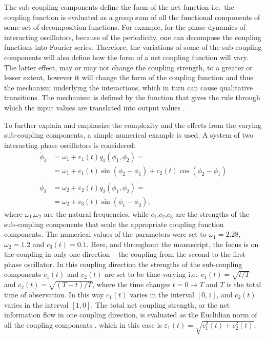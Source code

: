 \documentclass[pre,aps,twocolumn,showpacs]{revtex4}
\begin{document}
The sub-coupling components define the form of the net function i.e.\ the coupling function is evaluated as a group sum of all the functional components of some set of decomposition functions. For example, for the phase dynamics of interacting oscillators, because of the periodicity, one can decompose the coupling functions into Fourier series. Therefore, the variations of some of the sub-coupling components will also define how the form of a net coupling function will vary. The latter effect, may or may not change the coupling strength, to a greater or lesser extent, however it will change the form of the coupling function and thus the mechanism underlying the interactions, which in turn can cause qualitative transitions. The mechanism is defined by the function that gives the rule through which the input values are translated into output values \cite{Friston:11,Barrett:13}.




To further explain and emphasize the complexity and the effects from the varying sub-coupling components, a simple numerical example is used. A system of two interacting phase oscillators \cite{Kuramoto:84,Petkoski:12a} is considered:
\begin{equation}\label{eq:model}
\begin{split}
   \dot \phi_1&=\omega_1+\varepsilon_1(t) q_1(\phi_1,\phi_2)=\\ &=\omega_1+c_1(t)\sin(\phi_2-\phi_1)+c_2(t)\cos(\phi_2-\phi_1)\\\text{ }\\
   \dot \phi_2&=\omega_2+\varepsilon_2(t) q_2(\phi_1,\phi_2)=\\ &=\omega_2+c_3(t)\sin(\phi_1-\phi_2),
   \end{split}
\end{equation}
where $\omega_1$,$\omega_2$ are the natural frequencies, while $c_1$,$c_2$,$c_3$ are the strengths of the sub-coupling components that scale the appropriate coupling function components. The numerical values of the parameters were set to $\omega_1=2.28$, $\omega_2=1.2$ and $c_3(t)=0.1$. Here, and throughout the manuscript, the focus is  on the coupling in only one direction -- the coupling from the second to the first phase oscillator. In this coupling direction the strengths of the sub-coupling components $c_1(t)$ and $c_2(t)$ are set to be time-varying i.e.\ $c_1(t)=\sqrt{t/T}$ and $c_2(t)=\sqrt{(T-t)/T}$, where the time changes $t=0\rightarrow T$ and $T$ is the total time of observation. In this way $c_1(t)$ varies in the interval $[0,1]$, and $c_2(t)$ varies in the interval $[1,0]$. The total net coupling strength, or the net information flow in one coupling direction, is evaluated as the Euclidian norm of all the coupling components \cite{Kralemann:08}, which in this case is $\varepsilon_1(t)=\sqrt{c_1^2(t)+c_2^2(t)}.$
\end{document}

